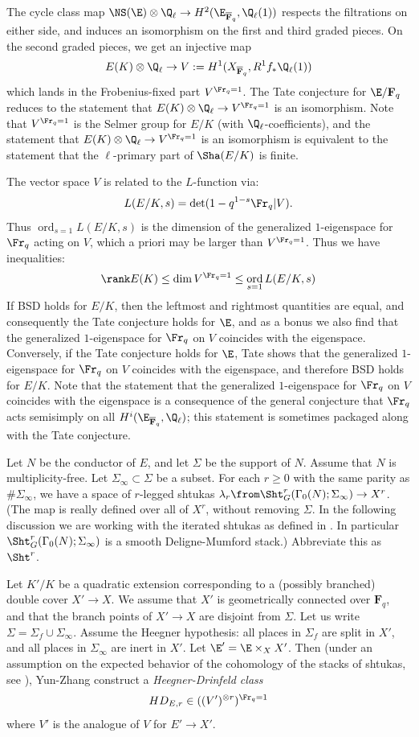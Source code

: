 \documentclass{article}
\def\F{\mathbf{F}}
\DeclareMathOperator{\ord}{ord}
\begin{document}
The cycle class map $\NS(\E)\otimes\Q_\ell \to H^2(\E_{\overline{\F}_q},\Q_\ell(1))$ respects the filtrations on either side, and induces an isomorphism on the first and third graded pieces.   On the second graded pieces, we get an injective map
\[ E(K)\otimes\Q_\ell \to V:=H^1(X_{\overline{\F}_q},R^1f_*\Q_\ell(1))\]
which lands in the Frobenius-fixed part $V^{\Fr_q=1}$.   The Tate conjecture for $\E/\F_q$ reduces to the statement that $E(K)\otimes\Q_\ell\to V^{\Fr_q=1}$ is an isomorphism.   Note that $V^{\Fr_q=1}$ is the Selmer group for $E/K$ (with $\Q_\ell$-coefficients), and the statement that $E(K)\otimes \Q_\ell\to V^{\Fr_q=1}$ is an isomorphism is equivalent to the statement that the $\ell$-primary part of $\Sha(E/K)$ is finite. 

The vector space $V$ is related to the $L$-function via:
\[ L(E/K,s) = \det (1-q^{1-s}\Fr_q \vert V ).\]
Thus $\ord_{s=1} L(E/K,s)$ is the dimension of the generalized $1$-eigenspace for $\Fr_q$ acting on $V$, which a priori may be larger than $V^{\Fr_q=1}$.   Thus we have inequalities:
\[ \rank E(K) \leq \dim V^{\Fr_q = 1} \leq \ord_{s=1} L(E/K,s) \]
If BSD holds for $E/K$, then the leftmost and rightmost quantities are equal, and consequently the Tate conjecture holds for $\E$, and as a bonus we also find that the generalized $1$-eigenspace for $\Fr_q$ on $V$ coincides with the eigenspace.  Conversely, if the Tate conjecture holds for $\E$, Tate shows that the generalized $1$-eigenspace for $\Fr_q$ on $V$ coincides with the eigenspace, and therefore BSD holds for $E/K$.  Note that the statement that the generalized $1$-eigenspace for $\Fr_q$ on $V$ coincides with the eigenspace is a consequence of the general conjecture that $\Fr_q$ acts semisimply on all $H^i(\E_{\overline{\F}_q},\Q_\ell)$;  this statement is sometimes packaged along with the Tate conjecture.

Let $N$ be the conductor of $E$, and let $\Sigma$ be the support of $N$.  Assume that $N$ is multiplicity-free.  Let $\Sigma_\infty\subset \Sigma$ be a subset.   For each $r\geq 0$ with the same parity as $\#\Sigma_\infty$, we have a space of $r$-legged shtukas $\lambda_r\from \Sht^r_G(\Gamma_0(N);\Sigma_\infty)\to X^r$.   (The map is really defined over all of $X^r$, without removing $\Sigma$.  In the following discussion we are working with the iterated shtukas as defined in \cite{YunZhangShtukasII}.  In particular $\Sht^r_G(\Gamma_0(N);\Sigma_\infty)$ is a smooth Deligne-Mumford stack.)   Abbreviate this as $\Sht^r$.  

Let $K'/K$ be a quadratic extension corresponding to a (possibly branched) double cover $X'\to X$.  We assume that $X'$ is geometrically connected over $\F_q$, and that the branch points of $X'\to X$ are disjoint from $\Sigma$.  Let us write $\Sigma=\Sigma_f\cup \Sigma_\infty$.  Assume the Heegner hypothesis:  all places in $\Sigma_f$ are split in $X'$, and all places in $\Sigma_\infty$ are inert in $X'$.   Let $\E'=\E\times_X X'$.  Then (under an assumption on the expected behavior of the cohomology of the stacks of shtukas, see \cite[Equation 1.9]{YunZhangShtukasII}), Yun-Zhang construct a {\em Heegner-Drinfeld class}
\[ HD_{E,r} \in ((V')^{\otimes r})^{\Fr_q=1} \]
where $V'$ is the analogue of $V$ for $E'\to X'$.    
\end{document}
